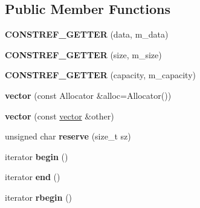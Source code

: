 \subsection*{Public Member Functions}
\begin{DoxyCompactItemize}
\item 
{\bfseries C\+O\+N\+S\+T\+R\+E\+F\+\_\+\+G\+E\+T\+T\+ER} (data, m\+\_\+data)\hypertarget{classgxx_1_1vector_a0ef0b9ec1028caaa68d4afcdaf96b197}{}\label{classgxx_1_1vector_a0ef0b9ec1028caaa68d4afcdaf96b197}

\item 
{\bfseries C\+O\+N\+S\+T\+R\+E\+F\+\_\+\+G\+E\+T\+T\+ER} (size, m\+\_\+size)\hypertarget{classgxx_1_1vector_a9dc97c77021ce0604e9a279ff5b80cd2}{}\label{classgxx_1_1vector_a9dc97c77021ce0604e9a279ff5b80cd2}

\item 
{\bfseries C\+O\+N\+S\+T\+R\+E\+F\+\_\+\+G\+E\+T\+T\+ER} (capacity, m\+\_\+capacity)\hypertarget{classgxx_1_1vector_ac107e09d73688eafaabe2fa9ceaf1047}{}\label{classgxx_1_1vector_ac107e09d73688eafaabe2fa9ceaf1047}

\item 
{\bfseries vector} (const Allocator \&alloc=Allocator())\hypertarget{classgxx_1_1vector_af5702202cdb76cc1c7f409204ebd4408}{}\label{classgxx_1_1vector_af5702202cdb76cc1c7f409204ebd4408}

\item 
{\bfseries vector} (const \hyperlink{classgxx_1_1vector}{vector} \&other)\hypertarget{classgxx_1_1vector_a980ead0139225a0e43a9858adfaec906}{}\label{classgxx_1_1vector_a980ead0139225a0e43a9858adfaec906}

\item 
unsigned char {\bfseries reserve} (size\+\_\+t sz)\hypertarget{classgxx_1_1vector_ae9757f2c9e808dd9b0d8695cc94cd849}{}\label{classgxx_1_1vector_ae9757f2c9e808dd9b0d8695cc94cd849}

\item 
iterator {\bfseries begin} ()\hypertarget{classgxx_1_1vector_a7e4bea1b2d9feaba6e6e16eb8954819c}{}\label{classgxx_1_1vector_a7e4bea1b2d9feaba6e6e16eb8954819c}

\item 
iterator {\bfseries end} ()\hypertarget{classgxx_1_1vector_ac20359405b0db557d136727ab1658ffc}{}\label{classgxx_1_1vector_ac20359405b0db557d136727ab1658ffc}

\item 
iterator {\bfseries rbegin} ()\hypertarget{classgxx_1_1vector_a9e7594b828060127ab3dca18692cc9b3}{}\label{classgxx_1_1vector_a9e7594b828060127ab3dca18692cc9b3}


\end{DoxyCompactItemize}
